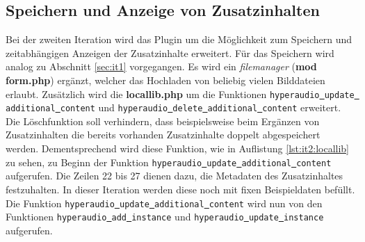 \subsection{Speichern und Anzeige von Zusatzinhalten}
Bei der zweiten Iteration wird das Plugin um die Möglichkeit zum Speichern und zeitabhängigen Anzeigen der Zusatzinhalte erweitert. Für das Speichern wird analog zu Abschnitt \ref{sec:it1} vorgegangen. Es wird ein \textit{filemanager} (\textbf{mod\underline{{ }}form.php}) ergänzt, welcher das Hochladen von beliebig vielen Bilddateien erlaubt. Zusätzlich wird die \textbf{locallib.php} um die Funktionen \mbox{\texttt{hyperaudio\underline{{ }}update\underline{{ }}additional\underline{{ }}content}} und \mbox{\texttt{hyperaudio\underline{{ }}delete\underline{{ }}additional\underline{{ }}content}} erweitert. Die Löschfunktion soll verhindern, dass beispielsweise beim Ergänzen von Zusatzinhalten die bereits vorhanden Zusatzinhalte doppelt abgespeichert werden. Dementsprechend wird diese Funktion, wie in Auflistung \ref{lst:it2:locallib} zu sehen, zu Beginn der Funktion \mbox{\texttt{hyperaudio\underline{{ }}update\underline{{ }}additional\underline{{ }}content}} aufgerufen. Die Zeilen 22 bis 27 dienen dazu, die Metadaten des Zusatzinhaltes festzuhalten. In dieser Iteration werden diese noch mit fixen Beispieldaten befüllt. Die Funktion \mbox{\texttt{hyperaudio\underline{{ }}update\underline{{ }}additional\underline{{ }}content}} wird nun von den Funktionen \texttt{hyperaudio\underline{{ }}add\underline{{ }}instance} und \texttt{hyperaudio\underline{{ }}update\underline{{ }}instance} aufgerufen.

